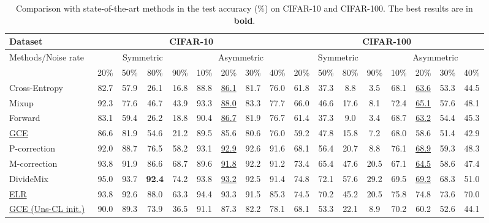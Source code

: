 \documentclass[10pt,twocolumn,letterpaper]{article}
\begin{document}
\begin{table*}[h]
	\caption{Comparison with state-of-the-art methods in the test accuracy (\%) on CIFAR-10 and CIFAR-100. The best results are in \textbf{bold}.} \centering
	\small
	\setlength\tabcolsep{3.5pt}
	\begin{tabular}{l|cccc|cccc|cccc|cccc}
		\hline \multirow{1}{*}{Dataset} & \multicolumn{8}{c}{ CIFAR-10} & \multicolumn{8}{|c}{CIFAR-100} \\
		\hline \multirow{2}{*}{Methods/Noise rate} & \multicolumn{4}{c}{ Symmetric} & \multicolumn{4}{|c|}{Asymmetric}  & \multicolumn{4}{c}{ Symmetric} & \multicolumn{4}{|c}{Asymmetric} \\\cline{2-17}
		& 20\% & 50\% & 80\% & 90\% & 10\% & 20\% & 30\% & 40\% & 20\% & 50\% & 80\% & 90\% & 10\% & 20\% & 30\% & 40\% \\
		\hline	
		Cross-Entropy & 82.7 & 57.9 & 26.1 & 16.8 & 88.8 & \underline{86.1} & 81.7 & 76.0 & 61.8 & 37.3 & 8.8 & 3.5 & 68.1 & \underline{63.6} & 53.3 & 44.5 \\	
		Mixup~\cite{zhang2018mixup} & 92.3 & 77.6 & 46.7 & 43.9 & 93.3 & \underline{88.0} & 83.3 & 77.7  & 66.0 & 46.6 & 17.6 & 8.1 & 72.4 & \underline{65.1} & 57.6 & 48.1\\			
		Forward~\cite{PatriniRMNQ17} & 83.1 & 59.4 & 26.2 & 18.8 & 90.4 & \underline{86.7} & 81.9 & 76.7  & 61.4 & 37.3 & 9.0 & 3.4 & 68.7 & \underline{63.2} & 54.4 & 45.3\\		
		\underline{GCE}~\cite{zhang2018generalized} & 86.6 & 81.9 & 54.6 & 21.2 & 89.5 & 85.6 & 80.6 & 76.0 & 59.2 & 47.8 & 15.8 & 7.2 & 68.0 & 58.6 & 51.4 & 42.9\\
		P-correction~\cite{YiW19} & 92.0 & 88.7 & 76.5 & 58.2 & 93.1 & \underline{92.9} & 92.6 & 91.6 & 68.1 & 56.4 & 20.7 & 8.8 & 76.1 & \underline{68.9} & 59.3 & 48.3\\ 		
		M-correction~\cite{ArazoOAOM19} & 93.8 & 91.9 & 86.6 & 68.7 & 89.6 & \underline{91.8} & 92.2 & 91.2  & 73.4 & 65.4 & 47.6 & 20.5 & 67.1 & \underline{64.5} & 58.6 & 47.4 \\             					
		DivideMix~\cite{LiSH20} & 95.0 & {93.7} & \textbf{92.4} & 74.2 & 93.8 & \underline{93.2} & 92.5 & 91.4 & 74.8 & {72.1} & 57.6 & 29.2 & 69.5 & \underline{69.2} & 68.3 & 51.0 \\		
		\underline{ELR}~\cite{LiuNRF20} & 93.8 & 92.6 & 88.0 & 63.3 &  94.4 & 93.3 & 91.5 & 85.3 & 74.5 & 70.2 & 45.2 & 20.5 & 75.8 & 74.8 & 73.6 & 70.0 \\
		\hline		
		\underline{GCE (Uns-CL init.)}~\cite{Ghosh2021} & 90.0 & 89.3 & 73.9 & 36.5 & 91.1 & 87.3 & 82.2 & 78.1 & 68.1 & 53.3 & 22.1 & 8.9 & 70.2 & 60.2 & 52.6 & 44.1 \\		

\end{tabular}
\end{table*}
\end{document}
